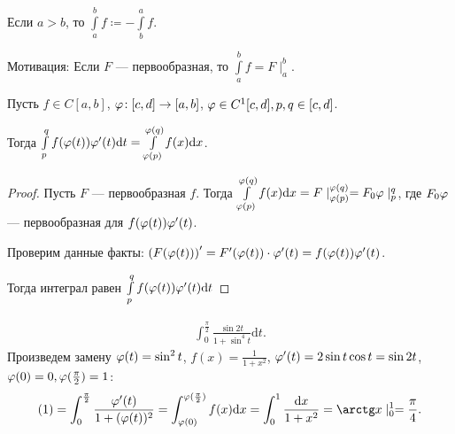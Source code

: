 \begin{remark}[Соглашение]
    Если $a>b$, то  $\int\limits_a^b f \coloneqq -\int\limits_b^a f$.

    Мотивация: Если  $F$ --- первообразная, то  $\int\limits_a^b f = F \mid_a^b$.
\end{remark}
\begin{theorem}
    Пусть $f \in C[a, b]$, $\varphi\!: [c,d] \to [a,b]$, $\varphi \in C^1[c,d], p, q \in [c, d]$.

    Тогда  $\int\limits_p^q f(\varphi(t)) \varphi'(t) \mathrm{d}t = \int\limits_{\varphi(p)}^{\varphi(q)} f(x) \mathrm{d}x$.
\end{theorem}
\begin{proof}
    Пусть $F$ --- первообразная  $f$. Тогда  $\int\limits_{\varphi(p)}^{\varphi(q)}f(x) \mathrm{d}x = F \mid_{\varphi(p)}^{\varphi(q)} = F_0\varphi\mid_p^q$, где $F_0\varphi$ --- первообразная для  $f(\varphi(t))\varphi'(t)$.

    Проверим данные факты:  $\left(F(\varphi(t))\right)' = F'(\varphi(t)) \cdot \varphi'(t) = f(\varphi(t))\varphi'(t)$.

    Тогда интеграл равен $\int\limits_{p}^qf(\varphi(t))\varphi'(t) \mathrm{d}t$
\end{proof}
\begin{example}
\begin{align}
    \int_0^{\frac{\pi}{2}} \frac{\sin 2t}{1 + \sin^4 t} \mathrm{d}t 
.\end{align}
Произведем замену $\varphi(t) = \sin^2 t$,  $f(x) = \frac{1}{1+x^2}$, $\varphi'(t) = 2 \sin t \cos t = \sin 2t$, $\varphi(0) = 0, \varphi(\frac{\pi}{2}) = 1$:
\begin{align*}
    (1) = \int_{0}^{\frac{\pi}{2}} \frac{\vphi'(t)}{1 + (\vphi(t))^2} = \int_{\vphi(0)}^{\vphi(\frac{\pi}{2})} f(x)\mathrm{d}x = \int_0^1 \frac{\mathrm{d}x}{1+x^2} = \arctg x \mid_0^1 = \frac{\pi}{4}.
\end{align*}
\end{example}
